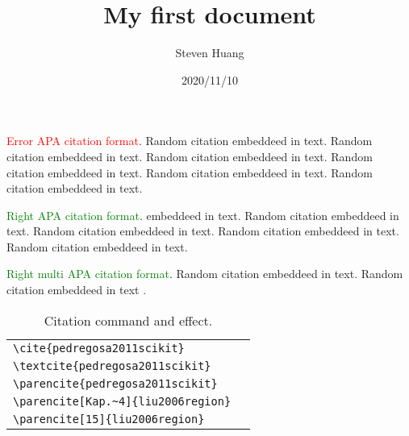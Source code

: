 \documentclass[12pt]{article}
\title{ My first document}
\date{2020/11/10}
\author{Steven Huang}
\begin{document}
\maketitle
{}

\textcolor{red}{Error APA citation format}. 
Random citation \cite{otsu1979threshold} embeddeed in text.
Random citation \cite{pedregosa2011scikit} embeddeed in text.
Random citation \cite{liu2006region} embeddeed in text.
Random citation \cite{mizushima2013image} embeddeed in text.
Random citation \cite{ray1999determination} embeddeed in text.
Random citation \cite{minaee2020image} embeddeed in text.

\textcolor{green}{Right APA citation format}. 
\textcite{long2015fully} embeddeed in text.
Random citation \textcite{noh2015learning} embeddeed in text.
Random citation \textcite{badrinarayanan2017segnet} embeddeed in text.
Random citation \parencite{ronneberger2015u} embeddeed in text.
Random citation embeddeed in text\parencite{milletari2016v}.

\textcolor{green}{Right multi APA citation format}. 
Random citation \parencite{milletari2016v,ronneberger2015u,noh2015learning} embeddeed in text.
Random citation embeddeed in text \parencite{minaee2020image,ronneberger2015u} .


\begin{table}[h!]
	\caption{Citation command and effect.}
	\begin{tabular}{ll}
	   \hline
	    \verb|\cite{pedregosa2011scikit}| & \cite{pedregosa2011scikit}\\
	    \verb|\textcite{pedregosa2011scikit}| & \textcite{pedregosa2011scikit}\\
	    \verb|\parencite{pedregosa2011scikit}| & \parencite{pedregosa2011scikit}\\
	    \verb|\parencite[Kap.~4]{liu2006region}| & \parencite[Kap.~4]{liu2006region}\\
	    \verb|\parencite[15]{liu2006region}| & \parencite[15]{liu2006region}\\
	   \hline
	\end{tabular}
\end{table}

\newpage
\printbibliography
\end{document}
